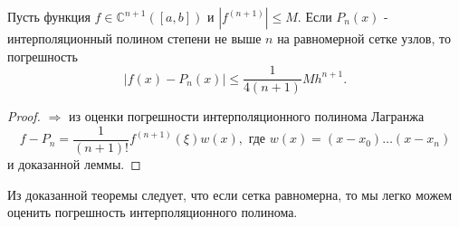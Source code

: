 \begin{theorem}
  Пусть функция $f \in \mathbb{C}^{n + 1}\left( [a, b] \right)$ и $\left| f^{(n+1)}\right| \leqslant M$. Если $P_n(x)$ - интерполяционный полином степени не выше $n$ на равномерной сетке узлов, то погрешность
  \begin{equation*}
    \left| f(x) - P_n(x) \right| \leqslant \dfrac{1}{4 (n + 1)} M h^{n+1}.
  \end{equation*}
\end{theorem}
\begin{proof}
  $\Rightarrow$ из оценки погрешности интерполяционного полинома Лагранжа
  \begin{equation*}
    f - P_n = \dfrac{1}{(n+1)!} f^{(n+1)} (\xi) w(x), \text{ где } w(x) = (x - x_0) \ldots (x - x_n)
  \end{equation*}
  и доказанной леммы.
\end{proof}

Из доказанной теоремы следует, что если сетка равномерна, то мы легко можем оценить погрешность интерполяционного полинома.
